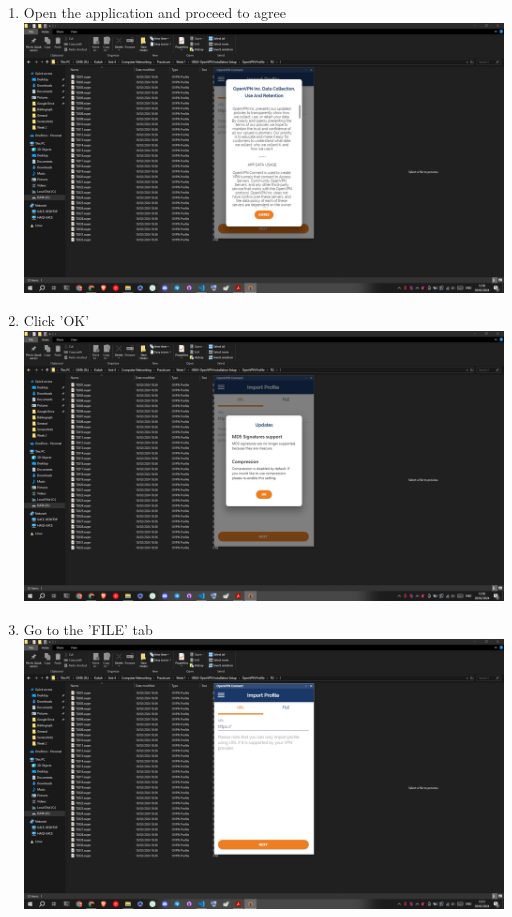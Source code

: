 \documentclass[12pt,titlepage]{article}
\begin{document}
\begin{enumerate}
    \item Open the application and proceed to agree \\ \includegraphics[width=.9\textwidth]{images/figures/Screenshot (449).png}
    \item Click 'OK' \\ \includegraphics[width=.9\textwidth]{images/figures/Screenshot (450).png}
    \newpage
    \item Go to the 'FILE' tab \\ \includegraphics[width=.9\textwidth]{images/figures/Screenshot (451).png}

\end{enumerate}
\end{document}
